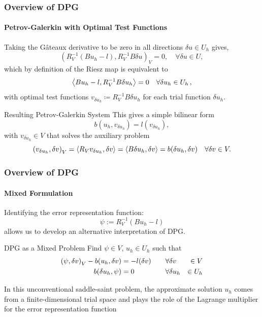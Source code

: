 \documentclass[18pt,xcolor=table]{beamer}
\begin{document}
\begin{frame}[t]
\frametitle{Overview of DPG}
\framesubtitle{Petrov-Galerkin with Optimal Test Functions}
Taking the G\^ateaux derivative to be zero in all directions $\delta u \in
U_h$ gives,
\[
\left(R_V^{-1}(Bu_h-l),R_V^{-1}B\delta u\right)_V = 0, \quad \forall \delta u \in U,
\]
which by definition of the Riesz map is equivalent to 
\begin{equation*}
\left\langle Bu_h-l,R_V^{-1}B\delta u_h \right\rangle=0\quad\forall\delta u_h\in U_h\,,
\end{equation*}
with optimal test functions $v_{\delta u_h}\coloneqq R_V^{-1}B\delta u_h$ for each trial function $\delta u_h$.
\begin{block}{Resulting Petrov-Galerkin System}
This gives a simple bilinear form
\begin{equation*}
b(u_h,v_{\delta u_h})=l(v_{\delta u_h}),
\end{equation*}
with $v_{\delta u_h}\in V$ that solves the auxiliary problem
\begin{equation*}
\left( v_{\delta u_h},\delta v \right)_V=\left\langle R_Vv_{\delta u_h},\delta v \right\rangle
=\left\langle B\delta u_h,\delta v \right\rangle=b(\delta u_h,\delta v)\quad\forall\delta v\in V.
\end{equation*}
\end{block}
\end{frame}

\begin{frame}[t]
\frametitle{Overview of DPG}
\framesubtitle{Mixed Formulation}
Identifying the error representation function:
\[
\psi:=R_V^{-1}(Bu_h-l)
\] 
allows us to develop an alternative interpretation of DPG.
\begin{block}{DPG as a Mixed Problem}
Find $\psi\in V$, $u_h\in U_h$ such that
\begin{equation*}
\begin{aligned}
\left( \psi,\delta v \right)_V-b(u_h,\delta v)&=-l(\delta v) \quad&\forall&\delta v&\in V\\
b(\delta u_h,\psi)&=0 \quad&\forall&\delta u_h&\in U_h
\end{aligned}
\end{equation*}
\end{block}
In this unconventional saddle-saint problem, the approximate solution $u_h$ comes from a finite-dimensional
trial space and plays the role of the Lagrange multiplier for the error representation function
\end{frame}
\end{document}
